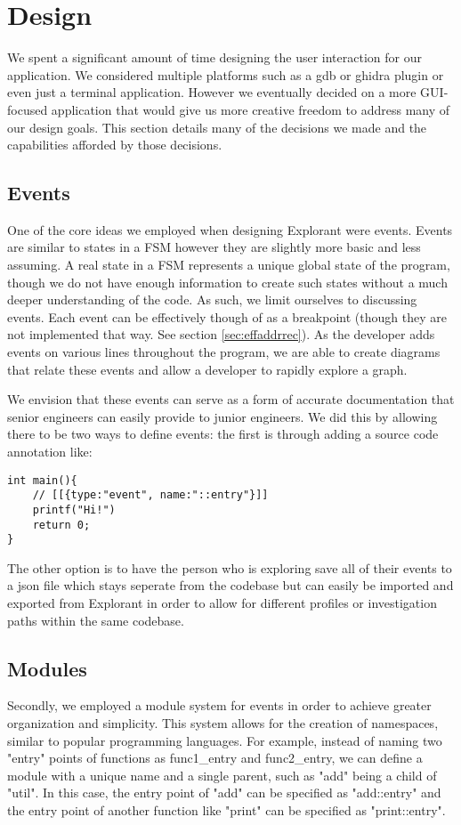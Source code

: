 \chapter{Design}
We spent a significant amount of time designing the user interaction for our application. We considered multiple platforms such as a gdb or ghidra plugin or even just a terminal application. However we eventually decided on a more GUI-focused application that would give us more creative freedom to address many of our design goals. This section details many of the decisions we made and the capabilities afforded by those decisions. 


\section{Events}
One of the core ideas we employed when designing Explorant were events. Events are similar to states in a FSM however they are slightly more basic and less assuming. A real state in a FSM represents a unique global state of the program, though we do not have enough information to create such states without a much deeper understanding of the code. As such, we limit ourselves to discussing events. Each event can be effectively though of as a breakpoint (though they are not implemented that way. See section \ref{sec:effaddrrec}). As the developer adds events on various lines throughout the program, we are able to create diagrams that relate these events and allow a developer to rapidly explore a graph.

We envision that these events can serve as a form of accurate documentation that senior engineers can easily provide to junior engineers. We did this by allowing there to be two ways to define events: the first is through adding a source code annotation like: 
\begin{verbatim}
int main(){
    // [[{type:"event", name:"::entry"}]]
    printf("Hi!")
    return 0;
}
\end{verbatim}
The other option is to have the person who is exploring save all of their events to a json file which stays seperate from the codebase but can easily be imported and exported from Explorant in order to allow for different profiles or investigation paths within the same codebase.



\section{Modules}
\label{sec:modules}
Secondly, we employed a module system for events in order to achieve greater organization and simplicity. This system allows for the creation of namespaces, similar to popular programming languages. For example, instead of naming two "entry" points of functions as func1\_entry and func2\_entry, we can define a module with a unique name and a single parent, such as "add" being a child of "util". In this case, the entry point of "add" can be specified as "add::entry" and the entry point of another function like "print" can be specified as "print::entry".

